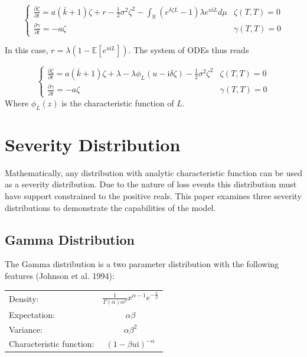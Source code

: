 \documentclass{article}
\theoremstyle{definition}
\begin{document}
\[
\begin{cases}
\frac{\partial \zeta}{\partial t}=a(\bar{k}+1) \zeta+r-\frac{1}{2} \sigma^2 \zeta^2-\int_{\mathbb{R}} \left(e^{\delta \zeta L}-1\right)\lambda e^{u\mathrm{i}L} d\mu & \zeta(T, T)=0\\
\frac{\partial \gamma}{\partial t}=-a \zeta & \gamma(T, T)=0
\end{cases} \]

In this case, \(r=\lambda(1-\mathbb{E}[e^{u\mathrm{i}L}])\).  The system of ODEs thus reads

\begin{equation}\label{ode}
\begin{cases}
\frac{\partial \zeta}{\partial t}=a(\bar{k}+1) \zeta+\lambda-\lambda\phi_L(u-\mathrm{i}\delta \zeta )-\frac{1}{2} \sigma^2 \zeta^2 & \zeta(T, T)=0\\
\frac{\partial \gamma}{\partial t}=-a \zeta & \gamma(T, T)=0
\end{cases} \end{equation}
Where \(\phi_L(z)\) is the characteristic function of \(L\).

\section{Severity Distribution}
Mathematically, any distribution with analytic characteristic function can be used as a severity distribution.  Due to the nature of loss events this distribution must have support constrained to the positive reals. This paper examines three severity distributions to demonstrate the capabilities of the model.

\subsection{Gamma Distribution}

The Gamma distribution is a two parameter distribution with the following features (Johnson et al. 1994):

\begin{center}
\begin{tabular}{lc}
Density: & \(\frac{1}{\Gamma(\alpha)\alpha^\beta}x^{\alpha-1} e^{-\frac{x}{\beta}}\)\\
Expectation: & \(\alpha \beta\) \\
Variance: & \(\alpha \beta^2\) \\
Characteristic function: & \((1-\beta u\mathrm{i})^{-\alpha} \)
\end{tabular}
\end{center}
\end{document}

